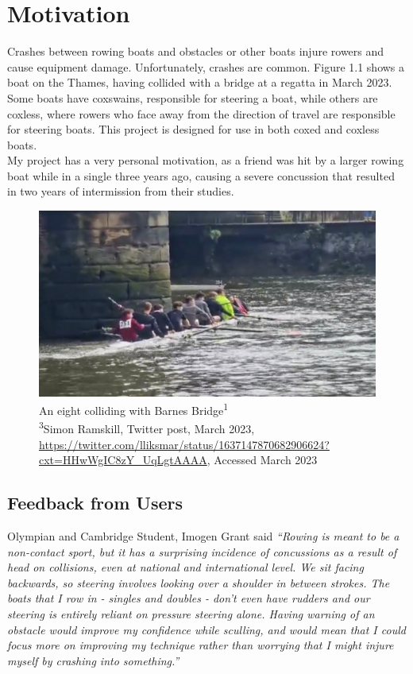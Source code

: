 \documentclass[12pt,a4paper]{report}
\begin{document}
\section{Motivation}	
Crashes between rowing boats and obstacles or other boats injure rowers and cause equipment damage. Unfortunately, crashes are common. Figure 1.1 shows a boat on the Thames, having collided with a bridge at a regatta in March 2023. Some boats have coxswains, responsible for steering a boat, while others are coxless, where rowers who face away from the direction of travel are responsible for steering boats. This project is designed for use in both coxed and coxless boats. \\
My project has a very personal motivation, as a friend was hit by a larger rowing boat while in a single three years ago, causing a severe concussion that resulted in two years of intermission from their studies. \\
\begin{figure}[h]
\begin{center}
\includegraphics[scale=0.5]{boatCrash.jpg.png}
\end{center}
\caption{An eight colliding with Barnes Bridge\textsuperscript{1} \\ \footnotesize\textsuperscript{3}Simon Ramskill, Twitter post, March 2023, \url{https://twitter.com/lliksmar/status/1637147870682906624?cxt=HHwWgIC8zY_UqLgtAAAA}, Accessed March 2023}
\end{figure}

\subsection{Feedback from Users}
Olympian and Cambridge Student, Imogen Grant said
\emph{``Rowing is meant to be a non-contact sport, but it has a surprising incidence of concussions as a result of head on collisions, even at national and international level. We sit facing backwards, so steering involves looking over a shoulder in between strokes. The boats that I row in - singles and doubles - don't even have rudders and our steering is entirely reliant on pressure steering alone. Having warning of an obstacle would improve my confidence while sculling, and would mean that I could focus more on improving my technique rather than worrying that I might injure myself by crashing into something.''}
\end{document}
